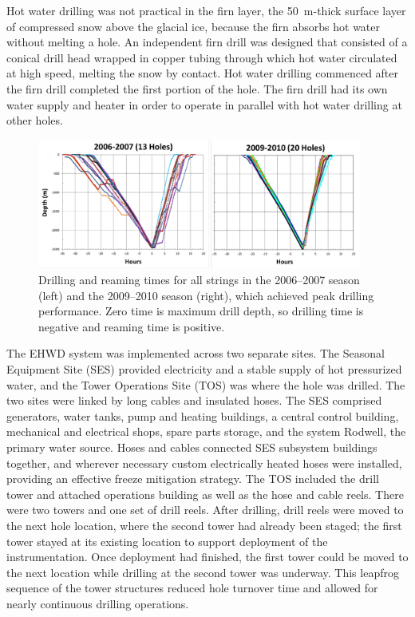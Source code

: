 Hot water drilling was not practical in the firn layer, the 50~m-thick surface layer of
compressed snow above the glacial ice, because the firn
absorbs hot water without melting a hole.  An independent
firn drill was designed that consisted of a conical drill
head wrapped in copper tubing through which hot water circulated at high speed,
melting the snow by contact. Hot water drilling commenced after the firn
drill completed the first portion of the hole. The firn drill had its own
water supply and heater in order to operate in parallel with hot water drilling
at other holes.

\begin{figure}[!ht]
 \centering
 \includegraphics[width=0.95\textwidth]{graphics/drill/drill_depthvtime.pdf}
\caption{Drilling and reaming times for all strings in the 2006--2007 season
  (left) and the 2009--2010 season (right), which achieved peak drilling
  performance. Zero time is maximum drill depth, so drilling time is
  negative and reaming time is positive.}
\label{fig:drilldepthtime}
\end{figure}

The EHWD system was implemented across two separate sites.  The Seasonal
Equipment Site (SES) provided electricity and a stable supply of hot
pressurized water, and the Tower Operations Site (TOS) was where the hole
was drilled.  The two sites were linked by long cables and insulated
hoses. The SES comprised generators, water tanks, pump and heating
buildings, a central control building, mechanical and electrical shops,
spare parts storage, and the system Rodwell, the primary water
source. Hoses and cables connected SES subsystem buildings together, and
wherever necessary custom electrically heated hoses were installed,
providing an effective freeze mitigation strategy. The TOS included the
drill tower and attached operations building as well as the hose and cable
reels.  There were two towers and one set of drill reels.  After drilling,
drill reels were moved to the next hole location, where the second tower
had already been staged; the first tower stayed at its existing location
to support deployment of the instrumentation.  Once deployment had
finished, the first tower could be moved to the next location while
drilling at the second tower was underway.  This leapfrog sequence of the
tower structures reduced hole turnover time and allowed for nearly
continuous drilling operations.

